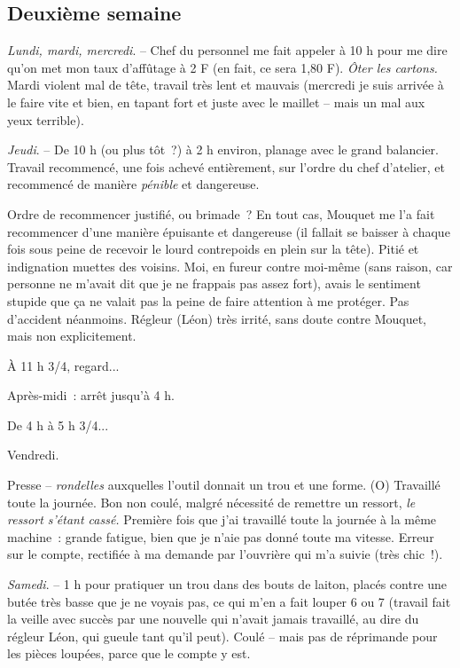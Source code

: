 \documentclass[french,twoside]{book} %
\begin{document}
\subsection[Deuxième semaine]{Deuxième semaine}
\noindent \par
{\itshape Lundi, mardi, mercredi}. – Chef du personnel me fait appeler à 10 h pour me dire qu'on met mon taux d'affûtage à 2 F (en fait, ce sera 1,80 F). {\itshape Ôter les cartons.} Mardi violent mal de tête, travail très lent et mauvais (mercredi je suis arrivée à le faire vite et bien, en tapant fort et juste avec le maillet – mais un mal aux yeux terrible).\par
{\itshape Jeudi}. – De 10 h (ou plus tôt ?) à 2 h environ, planage avec le grand balancier. Travail recommencé, une fois achevé entièrement, sur l'ordre du chef d'atelier, et recommencé de manière {\itshape pénible} et dangereuse.\par
Ordre de recommencer justifié, ou brimade ? En tout cas, Mouquet me l'a fait recommencer d'une manière épuisante et dangereuse (il fallait se baisser à chaque fois sous peine de recevoir le lourd contrepoids en plein sur la tête). Pitié et indignation muettes des voisins. Moi, en fureur contre moi-même (sans raison, car personne ne m'avait dit que je ne frappais pas assez fort), avais le sentiment stupide que ça ne valait pas la peine de faire attention à me protéger. Pas d'accident néanmoins. Régleur (Léon) très irrité, sans doute contre Mouquet, mais non explicitement.\par
À 11 h 3/4, regard...\par
Après-midi : arrêt jusqu'à 4 h.\par
De 4 h à 5 h 3/4...\par
Vendredi.\par
Presse – {\itshape rondelles} auxquelles l'outil donnait un trou et une forme. (O) Travaillé toute la journée. Bon non coulé, malgré nécessité de remettre un ressort, {\itshape le ressort s'étant cassé.} Première fois que j'ai travaillé toute la journée à la même machine : grande fatigue, bien que je n'aie pas donné toute ma vitesse. Erreur sur le compte, rectifiée à ma demande par l'ouvrière qui m'a suivie (très chic !).\par
{\itshape Samedi}. – 1 h pour pratiquer un trou dans des bouts de laiton, placés contre une butée très basse que je ne voyais pas, ce qui m'en a fait louper 6 ou 7 (travail fait la veille avec succès par une nouvelle qui n'avait jamais travaillé, au dire du régleur Léon, qui gueule tant qu'il peut). Coulé – mais pas de réprimande pour les pièces loupées, parce que le compte y est.\par
\end{document}

